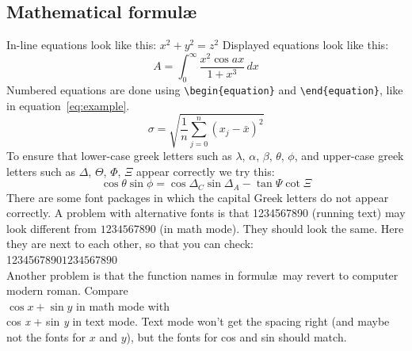 \documentclass{article}
\begin{document}
\subsection{Mathematical formul\ae}

In-line equations look like this: $x^2 + y^2 = z^2$ Displayed
equations look like this:
%
\[ A = \int_0^\infty \frac{x^2 \cos ax}{1+x^3}\, dx \]
%
Numbered equations are done using \verb+\begin{equation}+ and
  \verb+\end{equation}+, like in equation~\ref{eq:example}.
\begin{equation}
\label{eq:example}
\sigma = \sqrt{  \frac{1}{n}\sum_{j=0}^n (x_j - \bar x)^2 }
\end{equation}
%
To ensure that lower-case greek letters such as $\lambda$, $\alpha$, $\beta$,
$\theta$, $\phi$, and upper-case greek letters such as $\Delta$,
$\Theta$, $\Phi$, $\Xi$ appear correctly we
try this: 
\[ \cos \theta \sin\phi = \cos\Delta_C \sin\Delta_A - \tan \Psi \cot
\Xi \]
There are some font packages in which the capital Greek letters do not
appear correctly.
%
%
A problem with alternative fonts is that 1234567890 (running text) may
look different from $1234567890$ (in math mode). They should look the
same. Here they are next to each other, so that you can
check:\\ 1234567890$1234567890$\\ Another problem is that the function
names in formul\ae\ may revert to computer modern
roman. Compare\\ $\cos x + \sin y$ in math mode with\\ cos \emph{x} +
sin \emph{y} in text mode. Text mode won't get the spacing right (and
maybe not the fonts for $x$ and $y$), but the fonts for cos and sin
should match.
\end{document}
